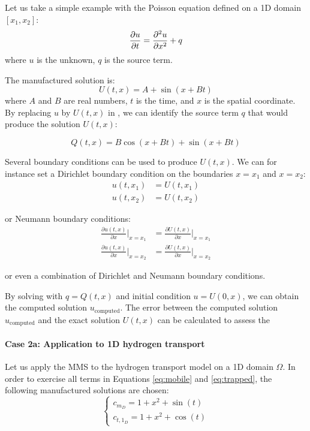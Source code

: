 Let us take a simple example with the Poisson equation defined on a 1D domain $[x_1, x_2]$:
\begin{equation}
    \frac{\partial u}{\partial t} = \frac{\partial^2 u}{\partial x^2} + q
    \labeq{poisson eq demo mms}
\end{equation}
where $u$ is the unknown, $q$ is the source term.

The manufactured solution is:
\begin{equation}
    U(t, x) = A + \sin{(x + B t)}
\end{equation}
where $A$ and $B$ are real numbers, $t$ is the time, and $x$ is the spatial coordinate.
By replacing $u$ by $U(t, x)$ in , we can identify the source term $q$ that would produce the solution $U(t, x)$:

\begin{equation}
    Q(t, x) = B \cos{(x + B t)} + \sin{(x + B t)}
\end{equation}

Several boundary conditions can be used to produce $U(t, x)$.
We can for instance set a Dirichlet boundary condition on the boundaries $x=x_1$ and $x=x_2$:
\begin{align}
    u(t, x_1) &= U(t, x_1) \\
    u(t, x_2) &= U(t, x_2)
\end{align}

or Neumann boundary conditions:
\begin{align}
    \frac{\partial u(t, x)}{\partial x}\Big | _{ x=x_1} &= \frac{\partial U(t, x)}{\partial x} \Big | _{ x=x_1} \\
    \frac{\partial u(t, x)}{\partial x}\Big | _{ x=x_2} &= \frac{\partial U(t, x)}{\partial x} \Big | _{ x=x_2}
\end{align}

or even a combination of Dirichlet and Neumann boundary conditions.

By solving  with $q = Q(t, x)$ and initial condition $u = U(0, x)$, we can obtain the computed solution $u_\mathrm{computed}$.
The error between the computed solution $u_\mathrm{computed}$ and the exact solution $U(t, x)$ can be calculated to assess the 

\paragraph{Case 2a: Application to 1D hydrogen transport}

Let us apply the MMS to the hydrogen transport model on a 1D domain $\Omega$.
In order to exercise all terms in Equations \ref{eq:mobile} and \ref{eq:trapped}, the following manufactured solutions are chosen:
\begin{equation}
    \begin{cases}
    c_{m_D} = 1 + x^2 + \sin(t) \\
    c_{{t,1}_D} = 1 + x^2 + \cos(t)
    \end{cases}
    \label{eq: manufactured solutions}
\end{equation}

